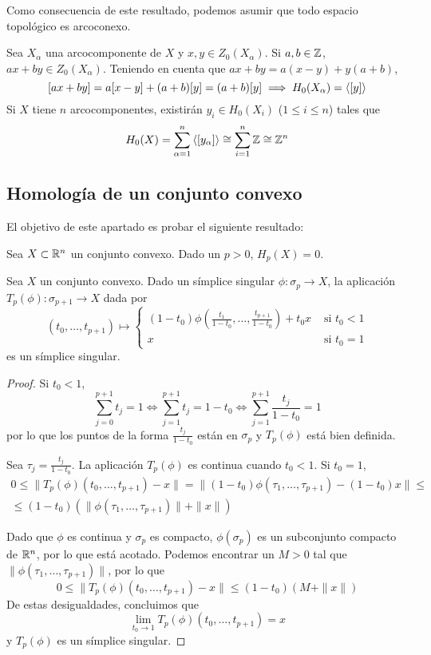 Como consecuencia de este resultado, podemos asumir que todo espacio topológico es arcoconexo.

Sea $X_\alpha$ una arcocomponente de $X$ y $x,y \in Z_0(X_\alpha)$.
Si $a,b \in \mathbb{Z}$, $ax+by \in Z_0(X_\alpha)$.
Teniendo en cuenta que $ax+by=a(x-y)+y(a+b)$,
	\[[ax+by]=a[x-y]+(a+b)[y]=(a+b)[y] \implies H_0(X_\alpha)=\left\langle [y]\right\rangle\]
Si $X$ tiene $n$ arcocomponentes, existirán $y_i \in H_0(X_i)$ ($1 \leq i \leq n$) tales que
	\[H_0(X)=\sum^n_{\alpha=1}\left\langle [y_\alpha]\right\rangle\cong\sum^n_{i=1}\mathbb{Z} \cong \mathbb{Z}^n\]

\subsection{Homología de un conjunto convexo}
El objetivo de este apartado es probar el siguiente resultado:
\begin{theorem}
	Sea $X \subset \mathbb{R}^n$ un conjunto convexo. Dado un $p > 0$, $H_p(X)=0$.
\end{theorem}

\begin{lemma}
	Sea $X$ un conjunto convexo.
	Dado un símplice singular $\phi\colon \sigma_{p} \to X$, la aplicación $T_p(\phi)\colon \sigma_{p+1} \to X$ dada por
	\[(t_0,\dots,t_{p+1})\mapsto
		\begin{cases}
		\displaystyle(1-t_0)
		\phi\left(\frac{t_1}{1-t_0},\dots,\frac{t_{p+1}}{1-t_0}\right)+t_0x
		&\mbox{ si }t_0 < 1\\
		x & \mbox{ si }t_0=1
		\end{cases}
	\]
	es un símplice singular.
\end{lemma}

\begin{proof}
	Si $t_0 < 1$,
	\begin{equation}\label{BienDef}
		\sum^{p+1}_{j=0}t_j=
		1 \iff \sum^{p+1}_{j=1}t_j=
		1-t_0 \iff \sum^{p+1}_{j=1}\frac{t_j}{1-t_0}=1
	\end{equation}
	por lo que los puntos de la forma $\frac{t_j}{1-t_0}$ están en $\sigma_p$ y $T_p(\phi)$ está bien definida.

	Sea $\tau_j=\frac{t_j}{1-t_0}$.
	La aplicación $T_p(\phi)$ es continua cuando $t_0 < 1$.
	Si $t_0=1$,
	\begin{multline*}
		0	\leq \|T_p(\phi)(t_0,\dots,t_{p+1})-x\|=\|(1-t_0)\phi(\tau_1,\dots,\tau_{p+1})-(1-t_0)x\|\leq\\
			\leq (1-t_0)(\|\phi(\tau_1,\dots,\tau_{p+1})\|+\|x\|)
	\end{multline*}

	Dado que $\phi$ es continua y $\sigma_p$ es compacto, $\phi(\sigma_p)$ es un subconjunto compacto de $\mathbb{R}^n$, por lo que está acotado.
	Podemos encontrar un $M > 0$ tal que $\|\phi(\tau_1,\dots,\tau_{p+1})\|$, por lo que
		\[0 \leq \|T_p(\phi)(t_0,\dots,t_{p+1})-x\| \leq (1-t_0)(M+\|x\|)\]
	De estas desigualdades, concluimos que
		\[\lim_{t_0 \to 1}T_p(\phi)(t_0,\dots,t_{p+1})=x\]
	y $T_p(\phi)$ es un símplice singular.
\end{proof}


